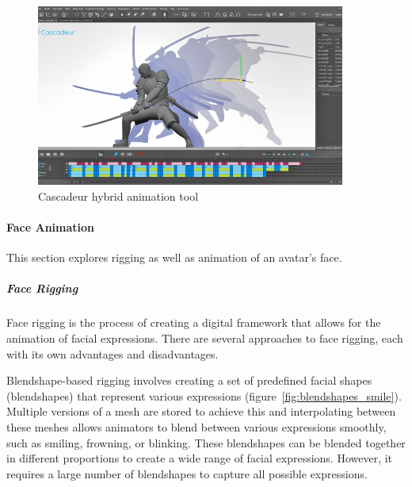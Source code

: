 \documentclass[../../main.tex]{subfiles}
\begin{document}
\begin{figure} 
  \centering \includegraphics[width = 4in]{chapters/background_work/images/cascadeur.png} 
  \caption{Cascadeur hybrid animation tool} 
  \label{fig:cascadeur} 
\end{figure}

\paragraph{Face Animation}
\label{ch:background_work:sign_language_synthesis:3d_techniques:avatar_animation:face_animation}

This section explores rigging as well as animation of an avatar's face.

\subparagraph{Face Rigging}
\label{ch:background_work:sign_language_synthesis:3d_techniques:avatar_animation:face_animation:face_rigging}

Face rigging is the process of creating a digital framework that allows for the animation of facial expressions. There are several approaches to face rigging, each with its own advantages and disadvantages.

Blendshape-based rigging involves creating a set of predefined facial shapes (blendshapes) that represent various expressions (figure~\ref{fig:blendshapes_smile}). Multiple versions of a mesh are stored to achieve this and interpolating between these meshes allows animators to blend between various expressions smoothly, such as smiling, frowning, or blinking. These blendshapes can be blended together in different proportions to create a wide range of facial expressions. However, it requires a large number of blendshapes to capture all possible expressions.
\end{document}
